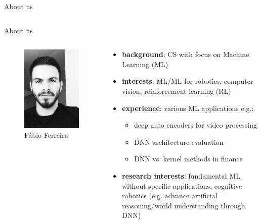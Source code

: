 \documentclass{beamer}
\begin{document}
\begin{frame}{About us}
\begin{columns}
\begin{column}{0.65\textwidth}
\begin{itemize}
\end{itemize}
\end{column}
\end{columns}
\end{frame}




\begin{frame}{About us}

\begin{columns}
\begin{column}{0.35\textwidth}
   \begin{figure}
	\includegraphics[width=0.6\linewidth]{fabio_bw}
	\caption*{Fábio Ferreira}
\end{figure}
\end{column}
\begin{column}{0.65\textwidth}  %
    \begin{itemize}
	\item \textbf{background}: CS with focus on Machine Learning (ML)
	\item \textbf{interests}: ML/ML for robotics, computer vision, reinforcement learning (RL)
	\item \textbf{experience}: various ML applications e.g.:
    \begin{itemize}
    \item deep auto encoders for video processing
    \item DNN architecture evaluation 
    \item DNN vs. kernel methods in finance
    \end{itemize}
	\item \textbf{research interests}: fundamental ML without specific applications, 	cognitive robotics (e.g. advance artificial reasoning/world understanding through DNN)
    
\end{itemize}
\end{column}
\end{columns}
\end{frame}
\end{document}

